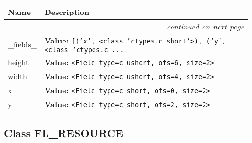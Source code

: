     \vspace{-1cm}
\hspace{\varindent}\begin{longtable}{|p{\varnamewidth}|p{\vardescrwidth}|l}
\cline{1-2}
\cline{1-2} \centering \textbf{Name} & \centering \textbf{Description}& \\
\cline{1-2}
\endhead\cline{1-2}\multicolumn{3}{r}{\small\textit{continued on next page}}\\\endfoot\cline{1-2}
\endlastfoot\raggedright \_\-f\-i\-e\-l\-d\-s\-\_\- & \raggedright \textbf{Value:} 
{\tt \texttt{[}\texttt{(}\texttt{'}\texttt{x}\texttt{'}\texttt{, }{\textless}class 'ctypes.c\_short'{\textgreater}\texttt{)}\texttt{, }\texttt{(}\texttt{'}\texttt{y}\texttt{'}\texttt{, }{\textless}class 'ctypes.c\_\texttt{...}}&\\
\cline{1-2}
\raggedright h\-e\-i\-g\-h\-t\- & \raggedright \textbf{Value:} 
{\tt {\textless}Field type=c\_ushort, ofs=6, size=2{\textgreater}}&\\
\cline{1-2}
\raggedright w\-i\-d\-t\-h\- & \raggedright \textbf{Value:} 
{\tt {\textless}Field type=c\_ushort, ofs=4, size=2{\textgreater}}&\\
\cline{1-2}
\raggedright x\- & \raggedright \textbf{Value:} 
{\tt {\textless}Field type=c\_short, ofs=0, size=2{\textgreater}}&\\
\cline{1-2}
\raggedright y\- & \raggedright \textbf{Value:} 
{\tt {\textless}Field type=c\_short, ofs=2, size=2{\textgreater}}&\\
\cline{1-2}
\end{longtable}



\subsection{Class FL\_RESOURCE}

